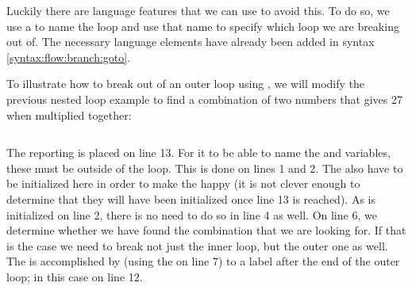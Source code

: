 Luckily there are language features that we can use to avoid this. To do so, we use a  to name the loop and use that name to specify which loop we are breaking out of. The necessary language elements have already been added in syntax \ref{syntax:flow:branch:goto}.

To illustrate how to break out of an outer loop using , we will modify the previous nested loop example to find a combination of two numbers that gives 27 when multiplied together:

\inputminted[linenos]{csharp}{../src/csharp/flow_repetition/nested_break/Program.cs}

The reporting is placed on line 13. For it to be able to name the  and  variables, these must be  outside of the loop. This is done on lines 1 and 2. The also have to be initialized here in order to make the  happy (it is not clever enough to determine that they will have been initialized once line 13 is reached). As  is initialized on line 2, there is no need to do so in line 4 as well. On line 6, we determine whether we have found the combination that we are looking for. If that is the case we need to break not just the inner loop, but the outer one as well. The is accomplished by  (using the  on line 7) to a label after the end of the outer loop; in this case on line 12.

